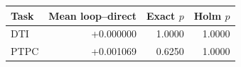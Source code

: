 \begin{center}\small\begin{tabular}{lrrr}\toprule
Task & Mean loop--direct & Exact $p$ & Holm $p$ \\
\midrule
DTI & +0.000000 & 1.0000 & 1.0000 \\
PTPC & +0.001069 & 0.6250 & 1.0000 \\
\bottomrule\end{tabular}\end{center}
